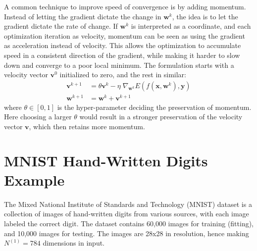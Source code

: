 A common technique to improve speed of convergence 
is by adding momentum.
Instead of letting the gradient dictate the change in $\mathbf{w}^k$,
the idea is to let the gradient dictate the rate of change.
If $\mathbf{w}^k$ is interpreted as a coordinate,
and each optimization iteration as velocity,
momentum can be seen as using the gradient as acceleration
instead of velocity. 
This allows the optimization to accumulate speed in 
a consistent direction of the gradient, 
while making it harder to slow down and 
converge to a poor local minimum.
The formulation starts with a velocity vector $\mathbf{v}^0$
initialized to zero, and the rest in similar:
%
\begin{equation}
\begin{aligned}
	\mathbf{v}^{k+1} &= \theta \mathbf{v}^{k} - \eta \; \nabla_{\mathbf{w}^k} 
				E\left(f(\mathbf{x},\mathbf{w}^k),\mathbf{y}\right) \\
	\mathbf{w}^{k+1} &= \mathbf{w}^{k} + \mathbf{v}^{k+1}
\end{aligned}
\end{equation}
%
where $\theta \in [0,1]$ is the hyper-parameter 
deciding the preservation of momentum.
Here choosing a larger $\theta$ would result in a stronger 
preservation of the velocity vector $\mathbf{v}$,
which then retains more momentum.














\section{MNIST Hand-Written Digits Example} \label{sc:MNIST}

\paragraph{}
The Mixed National Institute of Standards and Technology
(MNIST) dataset \cite{Le98} is a collection of images of hand-written digits
from various sources,
with each image labeled the correct digit.
The dataset contains 60,000 images for training (fitting),
and 10,000 images for testing.
The images are 28x28 in resolution,
hence making $N^{(1)} = 784$ dimensions in input.

